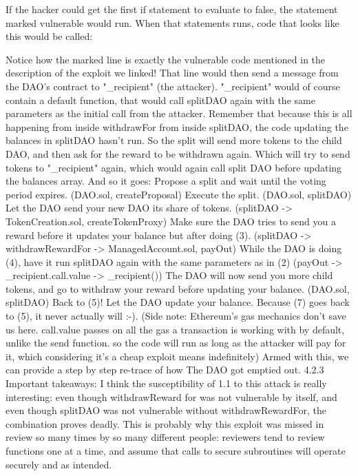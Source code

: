 If the hacker could get the first if statement to evaluate to false, the statement marked vulnerable would run. When that statements runs, code that looks like this would be called:



Notice how the marked line is exactly the vulnerable code mentioned in the description of the exploit we linked!
That line would then send a message from the DAO's contract to "_recipient" (the attacker). "_recipient" would of course contain a default function, that would call splitDAO again with the same parameters as the initial call from the attacker. Remember that because this is all happening from inside withdrawFor from inside splitDAO, the code updating the balances in splitDAO hasn't run. So the split will send more tokens to the child DAO, and then ask for the reward to be withdrawn again. Which will try to send tokens to "_recipient" again, which would again call split DAO before updating the balances array.
And so it goes:
Propose a split and wait until the voting period expires. (DAO.sol, createProposal)
Execute the split. (DAO.sol, splitDAO)
Let the DAO send your new DAO its share of tokens. (splitDAO -> TokenCreation.sol, createTokenProxy)
Make sure the DAO tries to send you a reward before it updates your balance but after doing (3). (splitDAO -> withdrawRewardFor -> ManagedAccount.sol, payOut)
While the DAO is doing (4), have it run splitDAO again with the same parameters as in (2) (payOut -> _recipient.call.value -> _recipient())
The DAO will now send you more child tokens, and go to withdraw your reward before updating your balance. (DAO.sol, splitDAO)
Back to (5)!
Let the DAO update your balance. Because (7) goes back to (5), it never actually will :-).
(Side note: Ethereum's gas mechanics don't save us here. call.value passes on all the gas a transaction is working with by default, unlike the send function. so the code will run as long as the attacker will pay for it, which considering it's a cheap exploit means indefinitely)
Armed with this, we can provide a step by step re-trace of how The DAO got emptied out.
4.2.3 Important takeaways:
I think the susceptibility of 1.1 to this attack is really interesting: even though withdrawReward for was not vulnerable by itself, and even though splitDAO was not vulnerable without withdrawRewardFor, the combination proves deadly. This is probably why this exploit was missed in review so many times by so many different people: reviewers tend to review functions one at a time, and assume that calls to secure subroutines will operate securely and as intended.
